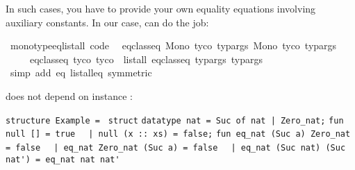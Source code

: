 \begin{isabellebody}
\begin{isamarkuptext}
  In such cases, you have to provide your own equality equations
  involving auxiliary constants.  In our case,
   can do the job:%
\end{isamarkuptext}%
\isamarkuptrue%
%
\isadelimquoteme
%
\endisadelimquoteme
%
\isatagquoteme
{}\isamarkupfalse%
\ monotype{\isacharunderscore}eq{\isacharunderscore}list{\isacharunderscore}all{}\ {\isacharbrackleft}code{\isacharbrackright}{\isacharcolon}\isanewline
\ \ {\isachardoublequoteopen}eq{\isacharunderscore}class{\isachardot}eq\ {\isacharparenleft}Mono\ tyco{}\ typargs{}{\isacharparenright}\ {\isacharparenleft}Mono\ tyco{}\ typargs{}{\isacharparenright}\ {\isasymlongleftrightarrow}\isanewline
\ \ \ \ \ eq{\isacharunderscore}class{\isachardot}eq\ tyco{}\ tyco{}\ {\isasymand}\ list{\isacharunderscore}all{}\ eq{\isacharunderscore}class{\isachardot}eq\ typargs{}\ typargs{}{\isachardoublequoteclose}\isanewline
\ \ \isamarkupfalse%
\ {\isacharparenleft}simp\ add{\isacharcolon}\ eq\ list{\isacharunderscore}all{}{\isacharunderscore}eq\ {\isacharbrackleft}symmetric{\isacharbrackright}{\isacharparenright}%
\endisatagquoteme
{\isafoldquoteme}%
%
\isadelimquoteme
%
\endisadelimquoteme
%
\begin{isamarkuptext}%
\noindent does not depend on instance :%
\end{isamarkuptext}%
\isamarkuptrue%
%
\isadelimquoteme
%
\endisadelimquoteme
%
\isatagquoteme
%
\begin{isamarkuptext}%
\isaverbatim%
\noindent%
\verb|structure Example = |\newline%
\verb|struct|\newline%
\newline%
\verb|datatype nat = Suc of nat |\verb,|,\verb| Zero_nat;|\newline%
\newline%
\verb|fun null [] = true|\newline%
\verb|  |\verb,|,\verb| null (x :: xs) = false;|\newline%
\newline%
\verb|fun eq_nat (Suc a) Zero_nat = false|\newline%
\verb|  |\verb,|,\verb| eq_nat Zero_nat (Suc a) = false|\newline%
\verb|  |\verb,|,\verb| eq_nat (Suc nat) (Suc nat') = eq_nat nat nat'|\newline%

\end{isamarkuptext}
\end{isabellebody}
